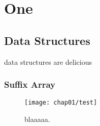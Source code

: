 \chapter{One}

\section{Data Structures}

data structures are delicious

\subsection{Suffix Array}

\begin{figure}[hbt]
    \centering
    \texttt{[image: chap01/test]}
    \caption{blaaaaa.}
    \label{fig:test}
\end{figure}
